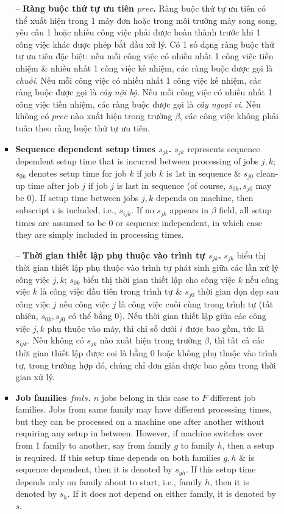 \documentclass{article}
\begin{document}
\begin{itemize}
\begin{itemize}
\begin{itemize}
            -- {\bf Ràng buộc thứ tự ưu tiên $prec$.} Ràng buộc thứ tự ưu tiên có thể xuất hiện trong 1 máy đơn hoặc trong môi trường máy song song, yêu cầu 1 hoặc nhiều công việc phải được hoàn thành trước khi 1 công việc khác được phép bắt đầu xử lý. Có 1 số dạng ràng buộc thứ tự ưu tiên đặc biệt: nếu mỗi công việc có nhiều nhất 1 công việc tiền nhiệm \& nhiều nhất 1 công việc kế nhiệm, các ràng buộc được gọi là {\it chuỗi}. Nếu mỗi công việc có nhiều nhất 1 công việc kế nhiệm, các ràng buộc được gọi là {\it cây nội bộ}. Nếu mỗi công việc có nhiều nhất 1 công việc tiền nhiệm, các ràng buộc được gọi là {\it cây ngoại vi}. Nếu không có $prec$ nào xuất hiện trong trường $\beta$, các công việc không phải tuân theo ràng buộc thứ tự ưu tiên.
            \item {\bf Sequence dependent setup times $s_{jk}$.} $s_{jk}$ represents sequence dependent setup time that is incurred between processing of jobs $j,k$; $s_{0k}$ denotes setup time for job $k$ if job $k$ is 1st in sequence \& $s_{j0}$ clean-up time after job $j$ if job $j$ is last in sequence (of course, $s_{0k},s_{j0}$ may be 0). If setup time between jobs $j,k$ depends on machine, then subscript $i$ is included, i.e., $s_{ijk}$. If no $s_{jk}$ appears in $\beta$ field, all setup times are assumed to be 0 or sequence independent, in which case they are simply included in processing times.

            -- {\bf Thời gian thiết lập phụ thuộc vào trình tự $s_{jk}$.} $s_{jk}$ biểu thị thời gian thiết lập phụ thuộc vào trình tự phát sinh giữa các lần xử lý công việc $j,k$; $s_{0k}$ biểu thị thời gian thiết lập cho công việc $k$ nếu công việc $k$ là công việc đầu tiên trong trình tự \& $s_{j0}$ thời gian dọn dẹp sau công việc $j$ nếu công việc $j$ là công việc cuối cùng trong trình tự (tất nhiên, $s_{0k},s_{j0}$ có thể bằng 0). Nếu thời gian thiết lập giữa các công việc $j,k$ phụ thuộc vào máy, thì chỉ số dưới $i$ được bao gồm, tức là $s_{ijk}$. Nếu không có $s_{jk}$ nào xuất hiện trong trường $\beta$, thì tất cả các thời gian thiết lập được coi là bằng 0 hoặc không phụ thuộc vào trình tự, trong trường hợp đó, chúng chỉ đơn giản được bao gồm trong thời gian xử lý.
            \item {\bf Job families $fmls$.} $n$ jobs belong in this case to $F$ different job families. Jobs from same family may have different processing times, but they can be processed on a machine one after another without requiring any setup in between. However, if machine switches over from 1 family to another, say from family $g$ to family $h$, then a setup is required. If this setup time depends on both families $g,h$ \& is sequence dependent, then it is denoted by $s_{gh}$. If this setup time depends only on family about to start, i.e., family $h$, then it is denoted by $s_h$. If it does not depend on either family, it is denoted by $s$.


\end{itemize}
\end{itemize}
\end{itemize}
\end{document}
